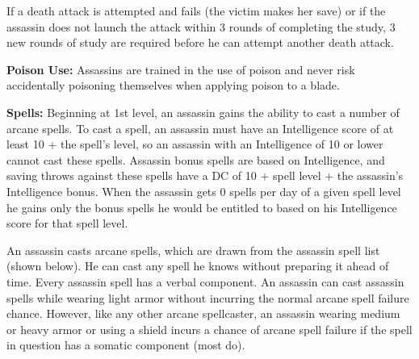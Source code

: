 {If a death attack is attempted and fails (the victim makes her save) or if the assassin does not launch the attack within 3 rounds of completing the study, 3 new rounds of study are required before he can attempt another death attack.

\textbf{Poison Use:} Assassins are trained in the use of poison and never risk accidentally poisoning themselves when applying poison to a blade.

\textbf{Spells:} Beginning at 1st level, an assassin gains the ability to cast a number of arcane spells. To cast a spell, an assassin must have an Intelligence score of at least 10 + the spell's level, so an assassin with an Intelligence of 10 or lower cannot cast these spells. Assassin bonus spells are based on Intelligence, and saving throws against these spells have a DC of 10 + spell level + the assassin's Intelligence bonus. When the assassin gets 0 spells per day of a given spell level he gains only the bonus spells he would be entitled to based on his Intelligence score for that spell level.

An assassin casts arcane spells, which are drawn from the assassin spell list (shown below). He can cast any spell he knows without preparing it ahead of time. Every assassin spell has a verbal component. An assassin can cast assassin spells while wearing light armor without incurring the normal arcane spell failure chance. However, like any other arcane spellcaster, an assassin wearing medium or heavy armor or using a shield incurs a chance of arcane spell failure if the spell in question has a somatic component (most do).


}
